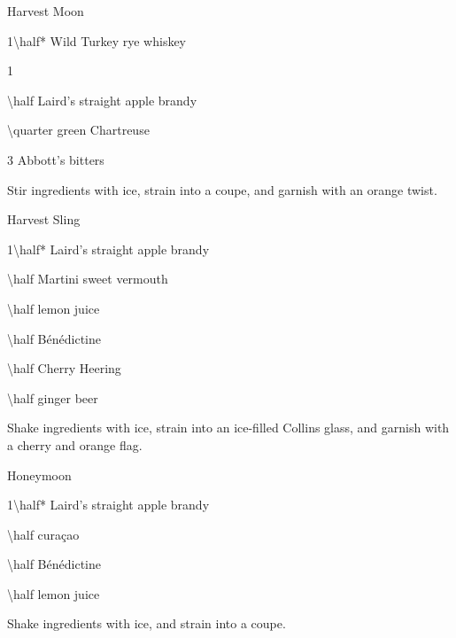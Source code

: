 \begin{PDTCocktail}{Harvest Moon}
	\begin{Ingredients}
	\item \SI{1\half*}{\oz} Wild Turkey rye whiskey
	\item \SI{1}{\oz} \Lillet
	\item \SI{\half}{\oz} Laird's straight apple brandy
	\item \SI{\quarter}{\oz} green Chartreuse
	\item 3 \si{\dashes} Abbott's bitters
	\end{Ingredients}
	
	\begin{Instructions}
	Stir ingredients with ice, strain into a coupe, and garnish with an orange twist.
	\end{Instructions}
\end{PDTCocktail}

\begin{PDTCocktail}{Harvest Sling}
	\begin{Ingredients}
	\item \SI{1\half*}{\oz} Laird's straight apple brandy
	\item \SI{\half}{\oz} Martini sweet vermouth
	\item \SI{\half}{\oz} lemon juice
	\item \SI{\half}{\oz} B\'en\'edictine
	\item \SI{\half}{\oz} Cherry Heering
	\item \SI{\half}{\oz} ginger beer
	\end{Ingredients}
	
	\begin{Instructions}
	Shake ingredients with ice, strain into an ice-filled Collins glass, and garnish with a cherry and orange flag.
	\end{Instructions}
\end{PDTCocktail}

\begin{PDTCocktail*}{Honeymoon}
	\begin{Ingredients}
	\item \SI{1\half*}{\oz} Laird's straight apple brandy
	\item \SI{\half}{\oz} cura\c cao
	\item \SI{\half}{\oz} B\'en\'edictine
	\item \SI{\half}{\oz} lemon juice
	\end{Ingredients}
	
	\begin{Instructions}
	Shake ingredients with ice, and strain into a coupe.
	\end{Instructions}
\end{PDTCocktail*}

